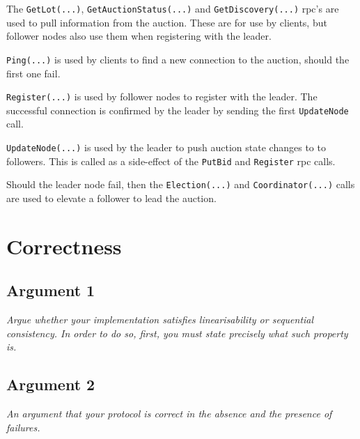 \documentclass[a4paper,11pt]{article}
\begin{document}
The \texttt{GetLot(...)}, \texttt{GetAuctionStatus(...)} and \texttt{GetDiscovery(...)} rpc's are used to pull information from the auction. These are for use by clients, but follower nodes also use them when registering with the leader. 

\bigbreak

\texttt{Ping(...)} is used by clients to find a new connection to the auction, should the first one fail. 

\bigbreak

\texttt{Register(...)} is used by follower nodes to register with the leader. The successful connection is confirmed by the leader by sending the first \texttt{UpdateNode} call. 

\bigbreak

\texttt{UpdateNode(...)} is used by the leader to push auction state changes to to followers. This is called as a side-effect of the \texttt{PutBid} and \texttt{Register} rpc calls. 

\bigbreak

Should the leader node fail, then the \texttt{Election(...)} and \texttt{Coordinator(...)} calls are used to elevate a follower to lead the auction. 

\pagebreak

\section{Correctness}

\subsection{Argument 1}

\textit{Argue whether your implementation satisfies linearisability or sequential consistency. In order to do so, first, you must state precisely what such property is.}

\subsection{Argument 2}

\textit{An argument that your protocol is correct in the absence and the presence of failures.}
\end{document}
